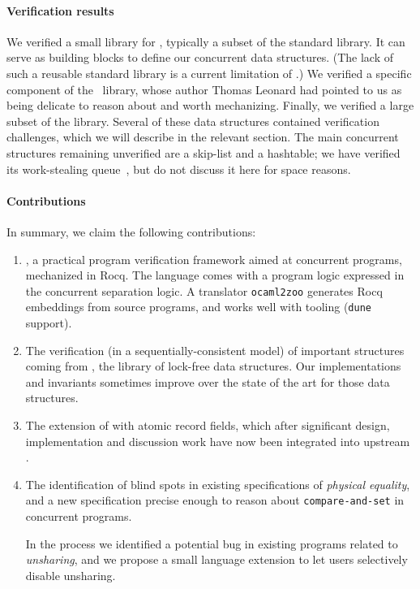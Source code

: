 \paragraph{Verification results} We verified a small library for \ZooLang, typically a subset of the \OCaml standard library. It can serve as building blocks to define our concurrent data structures. (The lack of such a reusable standard library is a current limitation of \HeapLang.) We verified a specific component of the \Eio~library, whose author Thomas Leonard had pointed to us as being delicate to reason about and worth mechanizing. Finally, we verified a large subset of the \Saturn library. Several of these data structures contained verification challenges, which we will describe in the relevant section. The main \Saturn concurrent structures remaining unverified are a skip-list and a hashtable; we have verified its work-stealing queue~\citep*{DBLP:conf/spaa/ChaseL05}, but do not discuss it here for space reasons.

\paragraph{Contributions} In summary, we claim the following contributions:
\begin{enumerate}
\item \Zoo, a practical program verification framework aimed at
  concurrent \OCaml programs, mechanized in Rocq. The language
  \ZooLang comes with a program logic expressed in the \Iris
  concurrent separation logic. A translator \texttt{ocaml2zoo}
  generates Rocq embeddings from source \OCaml programs, and works
  well with \OCaml tooling (\texttt{dune} support).

\item The verification (in a sequentially-consistent model) of
  important structures coming from \Saturn, the \OCamlFive library of
  lock-free data structures. Our implementations and invariants
  sometimes improve over the \Iris state of the art for those data
  structures.

\item The extension of \OCaml with atomic record fields, which after
  significant design, implementation and discussion work have now been
  integrated into upstream \OCaml.

\item The identification of blind spots in existing specifications of
  \emph{physical equality}, and a new specification precise
  enough to reason about \texttt{compare-and-set} in concurrent
  programs.

  In the process we identified a potential bug in existing \OCaml
  programs related to \emph{unsharing}, and we propose a small
  language extension to let users selectively disable unsharing.
\end{enumerate}

